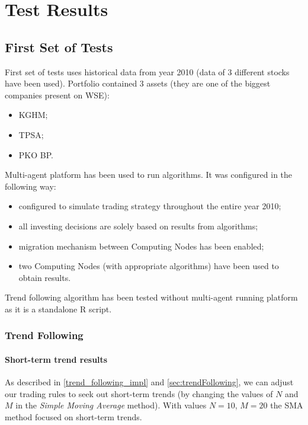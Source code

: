 \chapter{Test Results}
\label{cha:tests}

\section{First Set of Tests}
\label{sec:first_set_of_tests}

First set of tests uses historical data from year 2010 (data of 3 different stocks have been used). 
Portfolio contained 3 assets (they are one of the biggest companies present on WSE):

\begin{itemize} 
  \item KGHM;
  \item TPSA;
  \item PKO BP.
\end{itemize}

Multi-agent platform has been used to run algorithms.
It was configured in the following way: 

\begin{itemize}
  \item configured to simulate trading strategy throughout the entire year 2010;
  \item all investing decisions are solely based on results from algorithms;
  \item migration mechanism between Computing Nodes has been enabled;
  \item two Computing Nodes (with appropriate algorithms) have been used to obtain results.
\end{itemize}

Trend following algorithm has been tested without multi-agent running platform as it is a standalone R script.

\subsection{Trend Following}

\subsubsection{Short-term trend results}
\label{short-term}

As described in \ref{trend_following_impl} and \ref{sec:trendFollowing}, we can adjust our trading rules to seek out short-term trends
 (by changing the values of $N$ and $M$ in the \emph{Simple Moving Average} method).
With values $N = 10$, $M = 20$ the SMA method focused on short-term trends.
 

